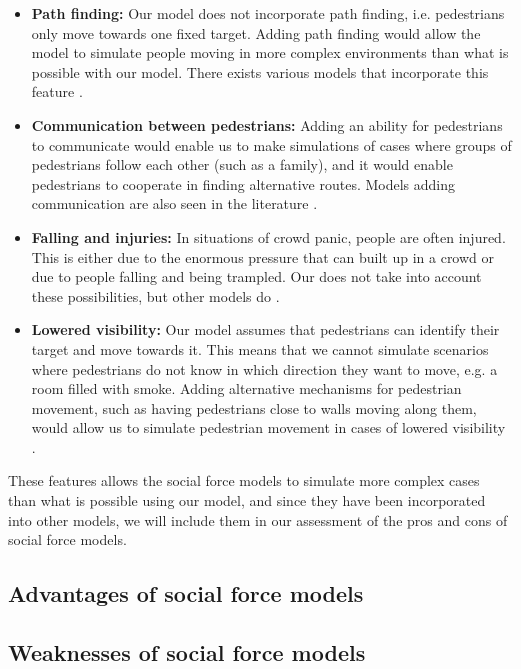 \begin{itemize}
    \item \textbf{Path finding:} Our model does not incorporate path 
        finding, i.e. pedestrians only move towards one fixed target. Adding 
        path finding would allow the model to simulate people moving in more 
        complex environments than what is possible with our model. There 
        exists various models that incorporate this feature \cite{HiDAC}.
 
    \item \textbf{Communication between pedestrians:} Adding an ability for 
        pedestrians to communicate would enable us to make simulations of 
        cases where groups of pedestrians follow each other (such as a 
        family), and it would enable pedestrians to cooperate in finding 
        alternative routes. Models adding communication are also seen in the 
        literature \cite{HiDAC}.

    \item \textbf{Falling and injuries:} In situations of crowd panic, people 
        are often injured. This is either due to the enormous pressure that 
        can built up in a crowd or due to people falling and being trampled.  
        Our does not take into account these possibilities, but other models 
        do \cite{HiDAC}.

    \item \textbf{Lowered visibility:} Our model assumes that pedestrians can 
        identify their target and move towards it. This means that we cannot 
        simulate scenarios where pedestrians do not know in which direction 
        they want to move, e.g. a room filled with smoke. Adding alternative 
        mechanisms for pedestrian movement, such as having pedestrians close 
        to walls moving along them, would allow us to simulate pedestrian 
        movement in cases of lowered visibility \cite{HelbingNew}.
\end{itemize}

These features allows the social force models to simulate more complex cases 
than what is possible using our model, and since they have been incorporated 
into other models, we will include them in our assessment of the pros and cons 
of social force models.

\subsection{Advantages of social force models}
\subsection{Weaknesses of social force models}

